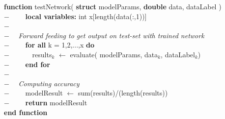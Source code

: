 \begin{addmargin}[2em]{0em}
\textbf{function} testNetwork( \textbf{struct} modelParams, \textbf{double} data, dataLabel )\\
    $- \qquad$ \textbf{local variables:} int x[length(data(:,1))]\\
    $- \qquad $\\
    $- \quad $ \textit{Forward feeding to get output on test-set with trained network}\\
    $- \qquad $ \textbf{for all} k = 1,2,...,x \textbf{do}\\
    $- \qquad \quad $ results$_k$ $\leftarrow$ evaluate( modelParams,  data$_{k}$, dataLabel$_{k}$)\\
    $- \qquad $ \textbf{end for}\\
    $- \qquad $\\
    $- \quad $ \textit{Computing accuracy}\\
    $- \qquad $ modelResult $\leftarrow$ sum(results)/(length(results))\\
    $- \qquad$ \textbf{return} modelResult\\
\textbf{end function}\\
\end{addmargin}

